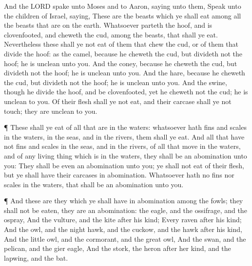  And the LORD spake unto Moses and to Aaron, saying unto
them,  Speak unto the children of Israel, saying, These are
the beasts which ye shall eat among all the beasts that are on the
earth.  Whatsoever parteth the hoof, and is clovenfooted,
and cheweth the cud, among the beasts, that shall ye eat. 
Nevertheless these shall ye not eat of them that chew the cud, or of
them that divide the hoof: as the camel, because he cheweth the cud, but
divideth not the hoof; he is unclean unto you.  And the
coney, because he cheweth the cud, but divideth not the hoof; he is
unclean unto you.  And the hare, because he cheweth the cud,
but divideth not the hoof; he is unclean unto you.  And the
swine, though he divide the hoof, and be clovenfooted, yet he cheweth
not the cud; he is unclean to you.  Of their flesh shall ye
not eat, and their carcase shall ye not touch; they are unclean to you.

 ¶ These shall ye eat of all that are in the waters:
whatsoever hath fins and scales in the waters, in the seas, and in the
rivers, them shall ye eat.  And all that have not fins and
scales in the seas, and in the rivers, of all that move in the waters,
and of any living thing which is in the waters, they shall be an
abomination unto you:  They shall be even an abomination
unto you; ye shall not eat of their flesh, but ye shall have their
carcases in abomination.  Whatsoever hath no fins nor
scales in the waters, that shall be an abomination unto you.

 ¶ And these are they which ye shall have in abomination
among the fowls; they shall not be eaten, they are an abomination: the
eagle, and the ossifrage, and the ospray,  And the vulture,
and the kite after his kind;  Every raven after his kind;
 And the owl, and the night hawk, and the cuckow, and the
hawk after his kind,  And the little owl, and the
cormorant, and the great owl,  And the swan, and the
pelican, and the gier eagle,  And the stork, the heron
after her kind, and the lapwing, and the bat.

